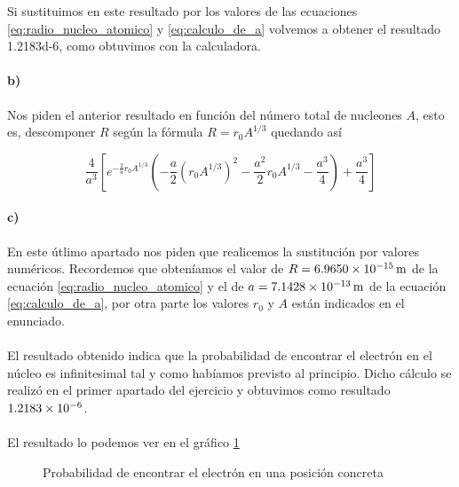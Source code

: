 \documentclass[12pt, a4paper]{article}
\begin{document}
    Si sustituimos en este resultado por los valores de las ecuaciones \ref{eq:radio_nucleo_atomico} y \ref{eq:calculo_de_a}
    volvemos a obtener el resultado \num{1.2183d-6}, como obtuvimos con la calculadora.

    \paragraph{b)} Nos piden el anterior resultado en función del número total de nucleones $A$, esto es, descomponer $R$ según
    la fórmula $R=r_0 A^{1/3}$ quedando así

    $$\frac{4}{a^3}\left[e^{-\frac{2}{a}r_0 A^{1/3}}\left(-\frac{a}{2}{(r_0 A^{1/3})}^2-\frac{a^2}{2}r_0 A^{1/3}-\frac{a^3}{4}\right)+\frac{a^3}{4}\right]$$

    \paragraph{c)} En este útlimo apartado nos piden que realicemos la sustitución por valores numéricos. Recordemos que obteníamos
    el valor de $R=\SI{6.9650d-15}{\meter}$ de la ecuación \ref{eq:radio_nucleo_atomico} y el de $a=\SI{7.1428d-13}{\meter}$ de la
    ecuación \ref{eq:calculo_de_a}, por otra parte los valores $r_0$ y $A$ están indicados en el enunciado.

    \paragraph{} El resultado obtenido indica que la probabilidad de encontrar el electrón en el núcleo es infinitesimal tal
    y como habíamos previsto al principio. Dicho cálculo se realizó en el primer apartado del ejercicio y obtuvimos como
    resultado $\num{1.2183d-6}$.

    \paragraph{} El resultado lo podemos ver en el gráfico \ref{gr:probabilidad_radio_electron}

    \begin{figure}[ht]
      \centering
      \caption{Probabilidad de encontrar el electrón en una posición concreta} \label{gr:probabilidad_radio_electron}
        \fontsize{8}{12}\selectfont
        \resizebox{1\textwidth}{!}{}
    \end{figure}
    \FloatBarrier   %
\end{document}
